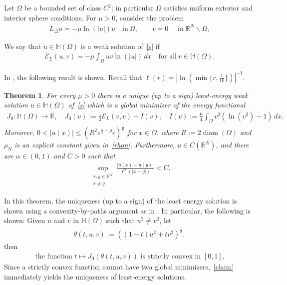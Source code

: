 \documentclass[11pt]{article}
\newcommand{\R}{\mathbb{R}}
\numberwithin{equation}{section}
\newtheorem{theorem}{Theorem}[section]
\begin{document}
 Let $\Omega$ be a bounded set of class $C^2$; in particular $\Omega$ satisfies uniform exterior and interior sphere conditions.  For $\mu>0$, consider the problem 
\begin{align}\label{s}
L_{\Delta}u=-\mu\ln(|u|)u\quad\mbox{in}~\Omega,\qquad v=0\quad \text{ in }\R^N\backslash \Omega,
\end{align}

We say that $u\in\mathbb{H}(\Omega)$ is a weak solution of~\eqref{s} if 
\begin{align*}
\mathcal{E}_{L}(u,v)=-\mu\int_{\Omega}uv\ln(|u|)\, dx\quad\mbox{for all}~v\in\mathbb{H}(\Omega).
\end{align*}


In \cite[Theorem 1.1]{AS22}, the following result is shown. Recall that $\ell(r)=|\ln(\min\{r,\tfrac{1}{10}\})|^{-1}$.

\begin{theorem}\label{exisleast:intro}
For every $\mu>0$ there is a unique (up to a sign) least-energy weak solution $u\in\mathbb H(\Omega)$ of~\eqref{s} which is a global minimizer of the energy functional
\begin{align}\label{J0def}
J_{0}:\mathbb{H}(\Omega)\rightarrow\mathbb{R},\quad J_{0}(v):=\frac{1}{2}\mathcal{E}_{L}(v,v)+I(v),\quad I(v):=\frac{\mu}{4}\int_{\Omega}v^{2}\left(\ln(v^{2})-1\right)\, dx.
\end{align}
Moreover, $0<|u(x)|\leq (R^{2}e^{\frac{1}{2}-\rho_{N}})^{\frac{1}{\mu}}$ for $x\in \Omega$, where $R:=2\operatorname{diam}(\Omega)$ and $\rho_N$ is an explicit constant given in~\eqref{rhon}. Furthermore, $u\in C(\R^N)$, and there are $\alpha\in (0,1)$ and $C>0$ such that
\begin{align}\label{lhr}
 \sup_{\substack{x,y\in\R^N \\ x\neq y}}\frac{|u(x)-u(y)|}{\ell^\alpha(|x-y|)}<C.
\end{align}
\end{theorem}

In this theorem, the uniqueness (up to a sign) of the least energy solution is shown using a convexity-by-paths argument as in \cite[Section 6]{BFMST18}.  In particular, the following is shown: Given $u$ and $v$ in $\mathbb H(\Omega)$ such that $u^2\neq v^2$, let 
\begin{align}\label{gamma}
\theta(t,u,v):=((1-t)u^2+ t v^2)^\frac{1}{2},    
\end{align}
then
\begin{align}\label{claim}
\text{the function $t\mapsto J_0(\theta(t,u,v))$ is strictly convex in $[0,1]$,}    
\end{align}
Since a strictly convex function cannot have two global minimizers,~\eqref{claim} immediately yields the uniqueness of least-energy solutions.
\end{document}

